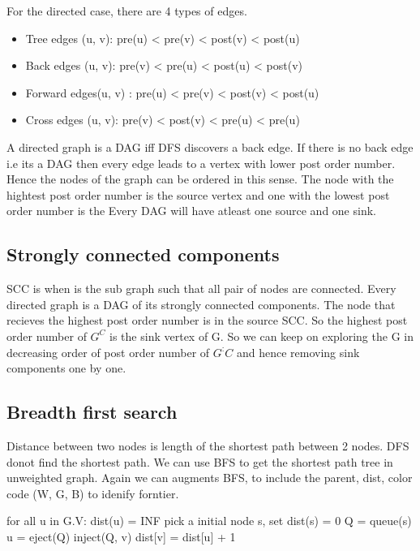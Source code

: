 \documentclass[11pt,letterpaper]{article}
\begin{document}
For the directed case, there are 4 types of edges. 
\begin{itemize}
	\item Tree edges (u, v): pre(u) < pre(v) < post(v) < post(u)
	\item Back edges (u, v): pre(v) < pre(u) < post(u) < post(v)
	\item Forward edges(u, v) : pre(u) < pre(v) < post(v) < post(u)
	\item Cross edges (u, v):  pre(v) < post(v) < pre(u) < pre(u)
\end{itemize}

A directed graph is a DAG iff DFS discovers a back edge. If there is no back edge i.e its a DAG then every edge leads to a vertex with lower post order number. Hence the nodes of the graph can be ordered in this sense. The node with the hightest post order number is the source vertex and one with the lowest post order number is the Every DAG will have atleast one source and one sink. 

\subsection{Strongly connected components}
SCC is when is the sub graph such that all pair of nodes are connected. Every directed graph is a DAG of its strongly connected components. The node that recieves the highest post order number is in the source SCC. So the highest post order number of $G^{C}$ is the sink vertex of G. So we can keep on exploring the G in decreasing order of post order number of $G^:{C}$ and hence removing sink components one by one. 


\subsection{Breadth first search}
Distance between two nodes is length of the shortest path between 2 nodes. DFS donot find the shortest path. We can use BFS to get the shortest path tree in unweighted graph. 
Again we can augments BFS, to include the parent, dist, color code (W, G, B) to idenify forntier. 

\begin{algorithm}
	\caption{}
	\begin{algorithmic}[1]
		\State for all u in G.V: dist(u) = INF
		\State pick a initial node s, set dist(s) = 0
		\State Q = queue(s)
			\State u = eject(Q)
					\State inject(Q, v)
					\State dist[v] = dist[u] + 1
				\EndIf
			\EndFor
		\EndWhile
	\end{algorithmic}
\end{algorithm}
\end{document}

